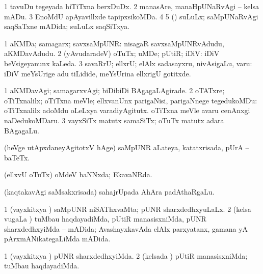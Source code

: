 {{{{{{\noindent 
\gl{\pagu}
\bmng
\bnum
\num{1}  tavuDu tegeyada hiTiTxna berxDuDx. 
\num{2}  manasAre, manaHpUNaRvAgi -- kelsa mADu. 
\num{3}  EnoMdU apAyavillxde tapipxsikoMDa. 
\num{4}  
\num{5}  (\ame) suLuLx; saMpUNaRvAgi saqSaTxne mADida; suLuLx saqSiTxya. 
\enum
\emng
\eentry

\bentry
{} 
\gl{\nA}
\expl{}
\bmng
\bnum
\num{1} aKMDa; samagarx; savxsaMpUNR:  nisagaR savxsaMpUNRvAdudu, aKMDavAdudu. 
\num{2} (yAvudaradeV) oTuTx; uMDe; pUtiR; iDiV:  iDiV beVsigeyanunx kaLeda. 
\num{3} savaRrU; ellxrU; elAlx sadasayxru, nivAsigaLu, \mo varu:  iDiV meYsUrige adu tiLidide, meYsUrina ellxrigU gotitxde. 
\enum
\emng

\noindent
\gl{\pagu}
\expl{}
\bmng
\bnum
\num{1}  aKMDavAgi; samagarxvAgi; biDibiDi BAgagaLAgirade. 
\num{2}  oTATxre; oTiTxnalilx; oTiTxna meVle; ellxvanUnx parigaNisi, parigaNnege tegedukoMDu:  oTiTxnalilx adoMdu oLeLxya varadiyAgitutx.  oTiTxna meVle avaru cenAnxgi naDedukoMDaru. 
\num{3}  vayxSiTx matutx samaSiTx; oTuTx matutx adara BAgagaLu. 
\enum
\emng
\eentry

\bentry
{}
 \gl{\nA}\bmng
(heVge utApxdaneyAgitotxV hAge) saMpUNR aLateya, katatxrisada, pUrA -- baTeTx. 
\emng
\eentry

\bentry
{}
  \gl{\gu}\bmng
(ellxvU oTuTx) oMdeV baNNxda; EkavaNRda. 
\emng
\eentry

\bentry
{} 
\gl{\nA}
\expl{}
\bmng
(kaqtakavAgi saMsakxrisada) sahajrUpada AhAra padAthaRgaLu. 
\emng
\eentry

\bentry
{}
  \gl{\gu}\bmng
\bnum
\num{1} (vayxkitxya \vi) saMpUNR niSAThxvaMta; pUNR sharxdedhxyuLaLx. 
\num{2} (kelsa \mo vugaLa \vi) tuMbau haqdayadiMda, pUtiR manasisxniMda, pUNR sharxdedhxyiMda -- mADida; AvashayxkavAda elAlx parxyatanx, gamana yA pArxmANikategaLiMda mADida. 
\enum
\emng
\eentry

\bentry
{}
  \gl{\kirxvi}\bmng
\bnum
\num{1} (vayxkitxya \vi) pUNR sharxdedhxyiMda. 
\num{2} (kelsada \vi) pUtiR manasisxniMda; tuMbau haqdayadiMda. 
\enum
\emng
\eentry

}}}}}}
